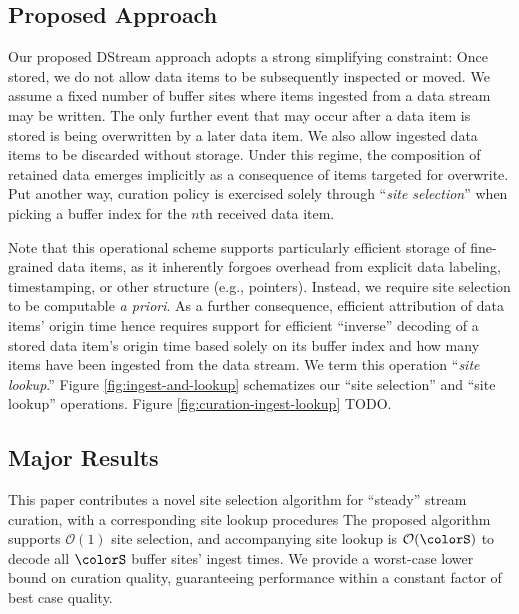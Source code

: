 \subsection{Proposed Approach}


Our proposed DStream approach adopts a strong simplifying constraint: Once stored, we do not allow data items to be subsequently inspected or moved.
We assume a fixed number of buffer sites where items ingested from a data stream may be written.
The only further event that may occur after a data item is stored is being overwritten by a later data item.
We also allow ingested data items to be discarded without storage.
Under this regime, the composition of retained data emerges implicitly as a consequence of items targeted for overwrite.
Put another way, curation policy is exercised solely through ``\textit{site selection}'' when picking a buffer index for the $n$th received data item.

Note that this operational scheme supports particularly efficient storage of fine-grained data items, as it inherently forgoes overhead from explicit data labeling, timestamping, or other structure (e.g., pointers).
Instead, we require site selection to be computable \textit{a priori}.
As a further consequence, efficient attribution of data items' origin time hence requires support for efficient ``inverse'' decoding of a stored data item's origin time based solely on its buffer index and how many items have been ingested from the data stream.
We term this operation ``\textit{site lookup}.''
Figure \ref{fig:ingest-and-lookup} schematizes our ``site selection'' and ``site lookup'' operations.
Figure \ref{fig:curation-ingest-lookup} TODO.


% 

\subsection{Major Results}

This paper contributes a novel site selection algorithm for ``steady'' stream curation, with a corresponding site lookup procedures
The proposed algorithm supports $\mathcal{O}(1)$ site selection, and accompanying site lookup is $\mathcal{O}(\colorS)$ to decode all $\colorS$ buffer sites' ingest times.
We provide a worst-case lower bound on curation quality, guaranteeing performance within a constant factor of best case quality.

